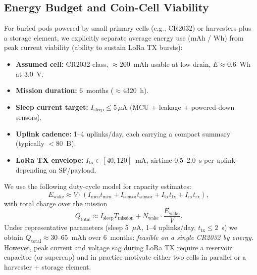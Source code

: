 \subsection{Energy Budget and Coin-Cell Viability}\label{subsec:energy-budget-and-coin-cell-viability}
For buried pods powered by small primary cells (e.g., CR2032) or harvesters plus a storage element, we explicitly
separate average energy use (mAh / Wh) from peak current viability (ability to sustain \ac{LoRa} TX bursts):
\begin{itemize}[nosep]
  \item \textbf{Assumed cell:} CR2032-class, $\approx 200$~mAh usable at low drain, $E \approx 0.6$~Wh at 3.0~V.
  \item \textbf{Mission duration:} 6~months ($\approx 4320$~h).
  \item \textbf{Sleep current target:} $I_{\text{sleep}} \le 5\,\mu\text{A}$ (\ac{MCU} + leakage + powered-down sensors).
  \item \textbf{Uplink cadence:} 1--4 uplinks/day, each carrying a compact summary (typically $< 80$~B).
  \item \textbf{LoRa TX envelope:} $I_{\text{tx}} \in [40,120]$~mA, airtime 0.5--2.0~s per uplink depending on \ac{SF}/payload.
\end{itemize}
We use the following duty-cycle model for capacity estimates:
\begin{equation}
  E_{\text{wake}} \approx V \cdot (I_{\text{mcu}} t_{\text{mcu}} + I_{\text{sensor}} t_{\text{sensor}} + I_{\text{tx}} t_{\text{tx}} + I_{\text{rx}} t_{\text{rx}}),\label{eq:equation2}
\end{equation}
with total charge over the mission
\begin{equation}
  Q_{\text{total}} \approx I_{\text{sleep}} T_{\text{mission}} + N_{\text{wake}} \cdot \frac{E_{\text{wake}}}{V}.\label{eq:equation}
\end{equation}
Under representative parameters (sleep 5~$\mu$A, 1--4 uplinks/day, $t_{\text{tx}} \le 2$~s) we obtain $Q_{\text{total}} \approx
30$--65~mAh over 6~months: \emph{feasible on a single CR2032 by energy}.
However, peak current and voltage sag during
\ac{LoRa} TX require a reservoir capacitor (or supercap) and in practice motivate either two cells in parallel or a
harvester + storage element.

